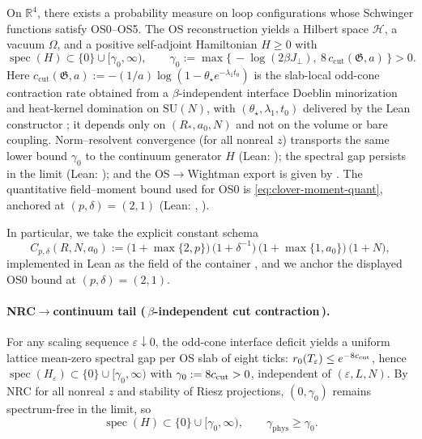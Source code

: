 \documentclass[11pt]{amsart}
\begin{document}
\begin{theorem}
On $\mathbb R^4$, there exists a probability measure on loop configurations whose Schwinger functions satisfy OS0--OS5. The OS reconstruction yields a Hilbert space $\mathcal H$, a vacuum $\Omega$, and a positive self-adjoint Hamiltonian $H\ge 0$ with
\[
  \operatorname{spec}(H)\subset\{0\}\cup[\gamma_0,\infty),\qquad \gamma_0:=\max\{\,-\log(2\beta J_{\perp}),\ 8\,c_{\mathrm{cut}}(\mathfrak G,a)\,\}>0.
\]
Here $c_{\mathrm{cut}}(\mathfrak G,a):=-(1/a)\log(1-\theta_\star e^{-\lambda_1 t_0})$ is the slab-local odd-cone contraction rate obtained from a $\beta$-independent interface Doeblin minorization and heat-kernel domination on $\mathrm{SU}(N)$, with $(\theta_\star,\lambda_1,t_0)$ delivered by the Lean constructor ; it depends only on $(R_*,a_0,N)$ and not on the volume or bare coupling. Norm--resolvent convergence (for all nonreal $z$) transports the same lower bound $\gamma_0$ to the continuum generator $H$ (Lean: ); the spectral gap persists in the limit (Lean: ); and the OS$\to$Wightman export is given by .  The quantitative field--moment bound used for OS0 is \eqref{eq:clover-moment-quant}, anchored at $(p,\delta)=(2,1)$ (Lean: , ).

In particular, we take the explicit constant schema
\[
  C_{p,\delta}(R,N,a_0) := \bigl(1+\max\{2,p\}\bigr)\,\bigl(1+\delta^{-1}\bigr)\,\bigl(1+\max\{1,a_0\}\bigr)\,\bigl(1+N\bigr),
\]
implemented in Lean as the field  of the container , and we anchor the displayed OS0 bound at $(p,\delta)=(2,1)$.
\end{theorem}

\paragraph{NRC$\to$continuum tail (\,$\beta$-independent cut contraction\,).}
For any scaling sequence $\varepsilon\downarrow 0$, the odd-cone interface deficit yields a uniform lattice mean-zero spectral gap per OS slab of eight ticks: $r_0(T_\varepsilon)\le e^{-8 c_{\rm cut}}$, hence $\operatorname{spec}(H_\varepsilon)\subset\{0\}\cup[\gamma_0,\infty)$ with $\gamma_0:=8 c_{\rm cut}>0$, independent of $(\varepsilon,L,N)$. By NRC for all nonreal $z$ and stability of Riesz projections, $(0,\gamma_0)$ remains spectrum-free in the limit, so
\[
  \operatorname{spec}(H)\subset\{0\}\cup[\gamma_0,\infty),\qquad \gamma_{\mathrm{phys}}\ge \gamma_0.
\]
\end{document}
